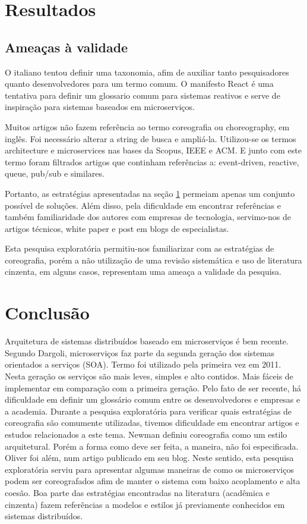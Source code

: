 \documentclass[12pt]{article}
\theoremstyle{plain}
\begin{document}
\section{Resultados}
\label{sec:resultados}

\subsection{Ameaças à validade}

O italiano tentou definir uma taxonomia, afim de auxiliar tanto pesquisadores quanto desenvolvedores para um termo comum. O manifesto React é uma tentativa para definir um glossario comum para sistemas reativos e serve de inspiração para sistemas baseados em microserviços.

Muitos artigos não fazem referência ao termo coreografia ou choreography, em inglês. Foi necessário alterar a string de busca e ampliá-la. Utilizou-se os termos architecture e microservices nas bases da Scopus, IEEE e ACM. E junto com este termo foram filtrados artigos que continham referências a: event-driven, reactive, queue, pub/sub e similares.

Portanto, as estratégias apresentadas na seção  \ref{sec:resultados} permeiam apenas um conjunto possível de soluções. Além disso, pela dificuldade em encontrar referências e também familiaridade dos autores com empresas de tecnologia, servimo-nos de artigos técnicos, white paper e post em blogs de especialistas. 

Esta pesquisa exploratória permitiu-nos familiarizar com as estratégias de coreografia, porém a não utilização de uma revisão sistemática e uso de literatura cinzenta, em alguns casos, representam uma ameaça a validade da pesquisa.

\section{Conclusão}
\label{sec:conclusao}

Arquitetura de sistemas distribuídos baseado em microserviços é bem recente. Segundo Dargoli, microserviços faz parte da segunda geração dos sistemas orientados a serviços (SOA). Termo foi utilizado pela primeira vez em 2011. Nesta geração os serviços são mais leves, simples e alto contidos. Mais fáceis de implementar em comparação com a primeira geração. Pelo fato de ser recente, há dificuldade em definir um glossário comum entre os desenvolvedores e empresas e a academia. Durante a pesquisa exploratória para verificar quais estratégias de coreografia são comumente utilizadas, tivemos dificuldade em encontrar artigos e estudos relacionados a este tema. Newman definiu coreografia como um estilo arquitetural. Porém a forma como deve ser feita, a maneira, não foi especificada. Oliver foi além, num artigo publicado em seu blog. 
Neste sentido, esta pesquisa exploratória serviu para apresentar algumas maneiras de como os microserviços podem ser coreografados afim de manter o sistema com baixo acoplamento e alta coesão. Boa parte das estratégias encontradas na literatura (acadêmica e cinzenta) fazem referências a modelos e estilos já previamente conhecidos em sistemas distribuídos. 




\end{document}
